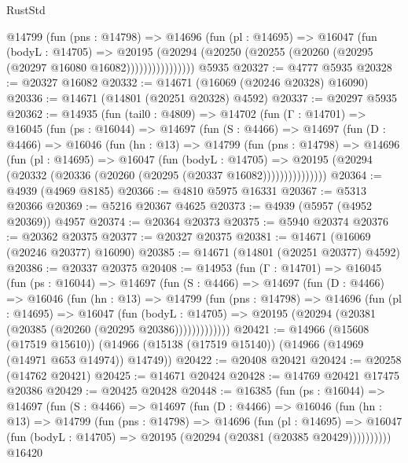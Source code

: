 \begin{lexlean}{RustStd}
\begin{coremodule}
                @14799
                  (fun (pns : @14798) =>
                  @14696
                    (fun (pl : @14695) =>
                    @16047
                      (fun (bodyL : @14705) =>
                      @20195
                        (@20294
                          (@20250 (@20255 (@20260 (@20295 (@20297 @16080 @16082))))))))))))))))
    @5935
@20327 := @4777 @5935
@20328 := @20327 @16082
@20332 := @14671 (@16069 (@20246 @20328) @16090)
@20336 := @14671 (@14801 (@20251 @20328) @4592)
@20337 := @20297 @5935
@20362 := @14935
    (fun (tail0 : @4809) =>
    @14702
      (fun (Γ : @14701) =>
      @16045
        (fun (ps : @16044) =>
        @14697
          (fun (S : @4466) =>
          @14697
            (fun (D : @4466) =>
            @16046
              (fun (hn : @13) =>
              @14799
                (fun (pns : @14798) =>
                @14696
                  (fun (pl : @14695) =>
                  @16047
                    (fun (bodyL : @14705) =>
                    @20195 (@20294 (@20332 (@20336 (@20260 (@20295 (@20337 @16082)))))))))))))))
@20364 := @4939 (@4969 @8185)
@20366 := @4810 @5975 @16331
@20367 := @5313 @20366
@20369 := @5216 @20367 @4625
@20373 := @4939 (@5957 (@4952 @20369)) @4957
@20374 := @20364 @20373
@20375 := @5940 @20374
@20376 := @20362 @20375
@20377 := @20327 @20375
@20381 := @14671 (@16069 (@20246 @20377) @16090)
@20385 := @14671 (@14801 (@20251 @20377) @4592)
@20386 := @20337 @20375
@20408 := @14953
    (fun (Γ : @14701) =>
    @16045
      (fun (ps : @16044) =>
      @14697
        (fun (S : @4466) =>
        @14697
          (fun (D : @4466) =>
          @16046
            (fun (hn : @13) =>
            @14799
              (fun (pns : @14798) =>
              @14696
                (fun (pl : @14695) =>
                @16047
                  (fun (bodyL : @14705) =>
                  @20195 (@20294 (@20381 (@20385 (@20260 (@20295 @20386)))))))))))))
@20421 := @14966
    (@15608 (@17519 @15610))
    (@14966 (@15138 (@17519 @15140)) (@14966 (@14969 (@14971 @653 @14974)) @14749))
@20422 := @20408 @20421
@20424 := @20258 (@14762 @20421)
@20425 := @14671 @20424
@20428 := @14769 @20421 @17475 @20386
@20429 := @20425 @20428
@20448 := @16385
    (fun (ps : @16044) =>
    @14697
      (fun (S : @4466) =>
      @14697
        (fun (D : @4466) =>
        @16046
          (fun (hn : @13) =>
          @14799
            (fun (pns : @14798) =>
            @14696
              (fun (pl : @14695) =>
              @16047 (fun (bodyL : @14705) => @20195 (@20294 (@20381 (@20385 @20429))))))))))
    @16420

\end{coremodule}
\end{lexlean}
